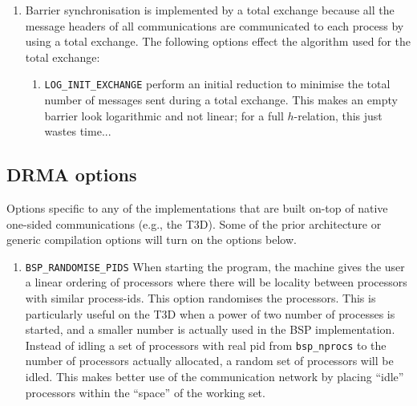 \begin{enumerate}
\item Barrier synchronisation is implemented by a total exchange
  because all the message headers of all communications are
  communicated to each process by using a total exchange. The
  following options effect the algorithm used for the total exchange:

  \begin{enumerate} \item \texttt{LOG\_INIT\_EXCHANGE} perform an
  initial reduction to minimise the total number of messages sent
  during a total exchange. This makes an empty barrier look
  logarithmic and not linear; for a full $h$-relation, this just
  wastes time...  \end{enumerate}
\end{enumerate}


\subsection{DRMA options}
Options specific to any of the implementations that are built on-top of
native one-sided communications (e.g., the T3D). Some of the prior
architecture or generic compilation options will turn on the options
below.

\begin{enumerate}
\item \texttt{BSP\_RANDOMISE\_PIDS} When starting the program, the
machine gives the user a linear ordering of processors where there
will be locality between processors with similar process-ids.  This
option randomises the processors. This is particularly useful on the
T3D when a power of two number of processes is started, and a smaller
number is actually used in the BSP implementation. Instead of idling a
set of processors with real pid from \texttt{bsp\_nprocs} to the
number of processors actually allocated, a random set of processors
will be idled. This makes better use of the communication network by
placing ``idle'' processors within the ``space'' of the working set.


\end{enumerate}%
